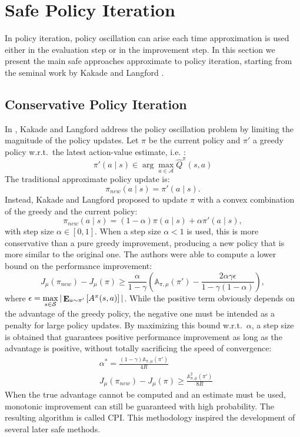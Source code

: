 \section{Safe Policy Iteration}\label{sec:spi}
In policy iteration, policy oscillation can arise each time approximation is used either in the evaluation step or in the improvement step.
In this section we present the main safe approaches approximate to policy iteration, starting from the seminal work by Kakade and Langford \cite{kakade2002approximately}.

\subsection{Conservative Policy Iteration}\label{sec:CPI}
In \cite{kakade2002approximately}, Kakade and Langford address the policy oscillation problem by limiting the magnitude of the policy updates.
Let $\pi$ be the current policy and $\pi'$ a greedy policy w.r.t.\ the latest action-value estimate, i.e. :
\[
	\pi'(a \mid s) \in \arg\max\limits_{a \in \mathcal{A}} \hat{Q}^{\pi}(s,a)
\]
The traditional approximate policy update is:
\[
	\pi_{new}(a \mid s) = \pi'(a \mid s).
\]
Instead, Kakade and Langford proposed to update $\pi$ with a convex combination of the greedy and the current policy:
\begin{equation} \label{eq:cpi}
	\pi_{new}(a \mid s) = (1-\alpha)\pi(a \mid s) + \alpha\pi'(a \mid s),
\end{equation}
with step size $\alpha \in [0,1]$. When a step size $\alpha<1$ is used, this is more conservative than a pure greedy improvement, producing a new policy that is more similar to the original one. 
The authors were able to compute a lower bound on the performance improvement:
\[
	J_\mu(\pi_{new}) - J_\mu(\pi) \geq \frac{\alpha}{1-\gamma}\left(\mathbb{A}_{\pi,\mu}(\pi')
		- \frac{2\alpha\gamma\epsilon}{1-\gamma(1-\alpha)}\right),
\]
where $\epsilon = \max\limits_{s \in \mathcal{S}}|\mathop{\mathbf{E}}_{a\sim{\pi'}}\left[A^\pi(s,a)\right]|$. While the positive term obviously depends on the advantage of the greedy policy, the negative one must be intended as a penalty for large policy updates. By maximizing this bound w.r.t.\ $\alpha$, a step size is obtained that guarantees positive performance improvement as long as the advantage is positive, without totally sacrificing the speed of convergence:
\begin{align}
&\alpha^* = \frac{(1-\gamma)\mathbb{A}_{\pi,\mu}(\pi')}{4R} \\
& J_\mu(\pi_{new}) - J_\mu(\pi) \geq \frac{\mathbb{A}^2_{\pi,\mu}(\pi')}{8R}
\end{align}
When the true advantage cannot be computed and an estimate must be used, monotonic improvement can still be guaranteed with high probability. The resulting algorithm is called \ac{CPI}.
This methodology inspired the development of several later safe methods.

